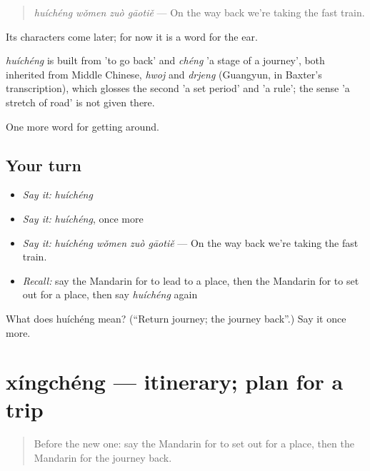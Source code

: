 \begin{quote}
\emph{huíchéng wǒmen zuò gāotiě} — On the way back we're taking the fast train.
\end{quote}

Its characters come later; for now it is a word for the ear.

\begin{cousinweb}
\emph{huíchéng} is built from  'to go back' and \emph{chéng} 'a stage of a journey', both inherited from Middle Chinese, \emph{hwoj} and \emph{drjeng} (Guangyun, in Baxter's transcription), which glosses the second 'a set period' and 'a rule'; the sense 'a stretch of road' is not given there.
\end{cousinweb}

\begin{grammarlens}[title={What you've built}]
One more word for getting around.
\end{grammarlens}

\subsection*{Your turn}
\begin{itemize}
\raggedright
  \item \emph{Say it:} \emph{huíchéng}
  \item \emph{Say it:} \emph{huíchéng}, once more
  \item \emph{Say it:} \emph{huíchéng wǒmen zuò gāotiě} — On the way back we're taking the fast train.
  \item \emph{Recall:} say the Mandarin for to lead to a place, then the Mandarin for to set out for a place, then say \emph{huíchéng} again
\end{itemize}

\begin{tcolorbox}[breakable,colback=teal!4,colframe=teal!35!black,title={Before you move on}]
What does huíchéng mean? (\textquotedblleft{}Return journey; the journey back\textquotedblright{}.) Say it once more.
\end{tcolorbox}
\section[xíngchéng]{xíngchéng — itinerary; plan for a trip}

\label{lesson:ZH-C428-xingcheng}



\begin{quote}
Before the new one: say the Mandarin for to set out for a place, then the Mandarin for the journey back.
\end{quote}


